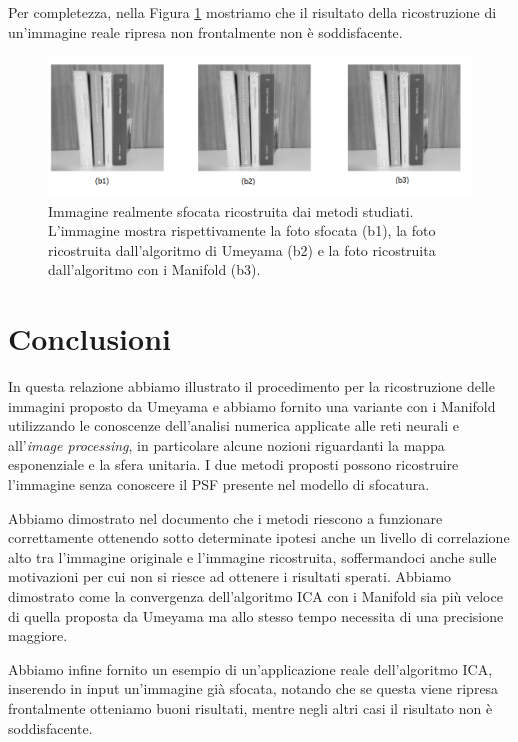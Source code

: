 \documentclass[final]{siamltex}
\begin{document}
{Per completezza, nella Figura \ref{imag:3.3nonbella} mostriamo che il risultato della ricostruzione di un'immagine reale ripresa non frontalmente non \`{e} soddisfacente.

\begin{figure}[h!]
\begin{center}
\includegraphics[width=1\columnwidth]{imag3nonbella.png}
\caption{Immagine realmente sfocata ricostruita dai metodi studiati. L'immagine mostra rispettivamente la foto sfocata (b1), la foto ricostruita dall'algoritmo di Umeyama (b2) e la foto ricostruita dall'algoritmo con i Manifold (b3).}
\label{imag:3.3nonbella}
\end{center}
\end{figure}
%
\section{Conclusioni}\label{sec4}
%
In questa relazione abbiamo illustrato il procedimento per la ricostruzione delle immagini proposto da Umeyama e abbiamo fornito una variante con i Manifold utilizzando le conoscenze dell'analisi numerica applicate alle reti neurali e all'\textit{image processing}, in particolare alcune nozioni riguardanti la mappa esponenziale e la sfera unitaria. I due metodi proposti possono ricostruire l'immagine senza conoscere il PSF presente nel modello di sfocatura.

Abbiamo dimostrato nel documento che i metodi riescono a funzionare correttamente ottenendo sotto determinate ipotesi anche un livello di correlazione alto tra l'immagine originale e l'immagine ricostruita, soffermandoci anche sulle motivazioni per cui non si riesce ad ottenere i risultati sperati. Abbiamo dimostrato come la convergenza dell'algoritmo ICA con i Manifold sia pi\`{u} veloce di quella proposta da Umeyama ma allo stesso tempo necessita di una precisione maggiore.

Abbiamo infine fornito un esempio di un'applicazione reale dell'algoritmo ICA, inserendo in input un'immagine gi\`{a} sfocata, notando che se questa viene ripresa frontalmente otteniamo buoni risultati, mentre negli altri casi il risultato non è soddisfacente.

}
\end{document}
